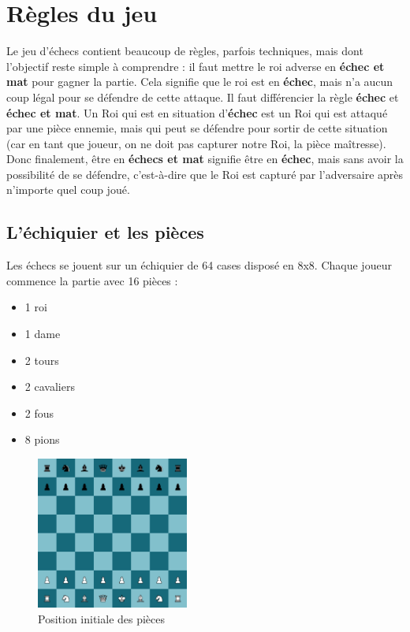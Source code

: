 \documentclass{article}
\begin{document}
\section{Règles du jeu}
Le jeu d'échecs contient beaucoup de règles, parfois techniques, mais dont l'objectif reste simple à comprendre :
il faut mettre le roi adverse en \textbf{échec et mat} pour gagner la partie. Cela signifie que le roi est en \textbf{échec},
mais n'a aucun coup légal pour se défendre de cette attaque. Il faut différencier la règle \textbf{échec} et 
\textbf{échec et mat}. Un Roi qui est en situation d'\textbf{échec} est un Roi qui est attaqué par une pièce
ennemie, mais qui peut se défendre pour sortir de cette situation (car en tant que joueur, on ne doit pas capturer notre Roi,
la pièce maîtresse). Donc finalement, être en \textbf{échecs et mat} signifie être en \textbf{échec}, mais sans avoir
la possibilité de se défendre, c'est-à-dire que le Roi est capturé par l'adversaire après n'importe quel coup joué.

\subsection{L'échiquier et les pièces}
Les échecs se jouent sur un échiquier de 64 cases disposé en 8x8. Chaque joueur commence la partie avec 16 pièces :
\begin{itemize}
    \item 1 roi
    \item 1 dame
    \item 2 tours
    \item 2 cavaliers
    \item 2 fous
    \item 8 pions
\end{itemize}

\begin{figure}[h]
    \centering
    \includegraphics[width=\textwidth,height=5.0cm,keepaspectratio]{jeuDepart.png}
    \caption{Position initiale des pièces}
\end{figure}
\end{document}

